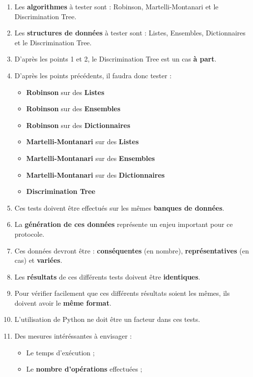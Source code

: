 \documentclass[11pt]{article}
\begin{document}
    \begin{enumerate}
        \item Les \textbf{algorithmes} à tester sont : Robinson, Martelli-Montanari et le Discrimination Tree.
        \item Les \textbf{structures de données} à tester sont : Listes, Ensembles, Dictionnaires et le Discrimination Tree.
        \item D'après les points 1 et 2, le Discrimination Tree est un cas \textbf{à part}.
        \item D'après les points précédents, il faudra donc tester :
        \begin{itemize}
            \item \textbf{Robinson} sur des \textbf{Listes}
            \item \textbf{Robinson} sur des \textbf{Ensembles}
            \item \textbf{Robinson} sur des \textbf{Dictionnaires}
            \item \textbf{Martelli-Montanari} sur des \textbf{Listes}
            \item \textbf{Martelli-Montanari} sur des \textbf{Ensembles}
            \item \textbf{Martelli-Montanari} sur des \textbf{Dictionnaires}
            \item \textbf{Discrimination Tree}
        \end{itemize}
        \item Ces tests doivent être effectués sur les mêmes \textbf{banques de données}.
        \item La \textbf{génération de ces données} représente un enjeu important pour ce protocole.
        \item Ces données devront être : \textbf{conséquentes} (en nombre), \textbf{représentatives} (en cas) et \textbf{variées}.
        \item Les \textbf{résultats} de ces différents tests doivent être \textbf{identiques}.
        \item Pour vérifier facilement que ces différents résultats soient les mêmes, ils doivent avoir le \textbf{même format}.
        \item L'utilisation de Python ne doit  être un facteur dans ces tests.
        \item  Des mesures intéréssantes à envisager :
        \begin{itemize}
            \item Le temps d'exécution ;
            \item Le \textbf{nombre d'opérations} effectuées ;

\end{itemize}
\end{enumerate}
\end{document}
